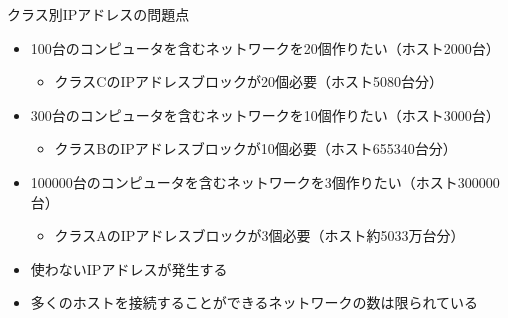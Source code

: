 \documentclass[12pt,aspectratio=169]{beamer}
\begin{document}
\begin{frame}{クラス別IPアドレスの問題点}

  \begin{itemize}
    \item 100台のコンピュータを含むネットワークを20個作りたい（ホスト2000台）
      \begin{itemize}
        \item クラスCのIPアドレスブロックが20個必要（ホスト5080台分）
      \end{itemize}

    \item 300台のコンピュータを含むネットワークを10個作りたい（ホスト3000台）
      \begin{itemize}
        \item クラスBのIPアドレスブロックが10個必要（ホスト655340台分）
      \end{itemize}

    \item 100000台のコンピュータを含むネットワークを3個作りたい（ホスト300000台）
      \begin{itemize}
        \item クラスAのIPアドレスブロックが3個必要（ホスト約5033万台分）
      \end{itemize}

    \item 使わないIPアドレスが発生する
    \item 多くのホストを接続することができるネットワークの数は限られている

  \end{itemize}

\end{frame}
\end{document}
